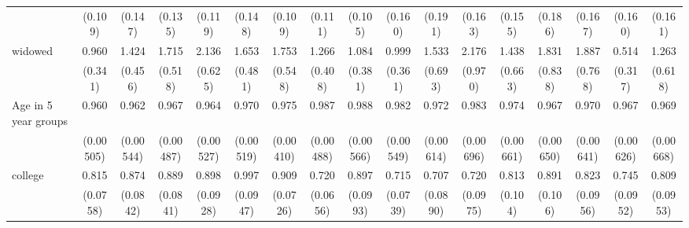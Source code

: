 {\begin{tabular}{l*{16}{c}}
                    &     (0.109)         &     (0.147)         &     (0.135)         &     (0.119)         &     (0.148)         &     (0.109)         &     (0.111)         &     (0.105)         &     (0.160)         &     (0.191)         &     (0.163)         &     (0.155)         &     (0.186)         &     (0.167)         &     (0.160)         &     (0.161)         \\
[1em]
widowed             &       0.960         &       1.424         &       1.715         &       2.136\sym{**} &       1.653         &       1.753         &       1.266         &       1.084         &       0.999         &       1.533         &       2.176         &       1.438         &       1.831         &       1.887         &       0.514         &       1.263         \\
                    &     (0.341)         &     (0.456)         &     (0.518)         &     (0.625)         &     (0.481)         &     (0.548)         &     (0.408)         &     (0.381)         &     (0.361)         &     (0.693)         &     (0.970)         &     (0.663)         &     (0.838)         &     (0.768)         &     (0.317)         &     (0.618)         \\
[1em]
Age in 5 year groups&       0.960\sym{***}&       0.962\sym{***}&       0.967\sym{***}&       0.964\sym{***}&       0.970\sym{***}&       0.975\sym{***}&       0.987\sym{*}  &       0.988\sym{*}  &       0.982\sym{**} &       0.972\sym{***}&       0.983\sym{*}  &       0.974\sym{***}&       0.967\sym{***}&       0.970\sym{***}&       0.967\sym{***}&       0.969\sym{***}\\
                    &   (0.00505)         &   (0.00544)         &   (0.00487)         &   (0.00527)         &   (0.00519)         &   (0.00410)         &   (0.00488)         &   (0.00566)         &   (0.00549)         &   (0.00614)         &   (0.00696)         &   (0.00661)         &   (0.00650)         &   (0.00641)         &   (0.00626)         &   (0.00668)         \\
[1em]
college             &       0.815\sym{*}  &       0.874         &       0.889         &       0.898         &       0.997         &       0.909         &       0.720\sym{***}&       0.897         &       0.715\sym{**} &       0.707\sym{**} &       0.720\sym{*}  &       0.813         &       0.891         &       0.823         &       0.745\sym{*}  &       0.809         \\
                    &    (0.0758)         &    (0.0842)         &    (0.0841)         &    (0.0928)         &    (0.0947)         &    (0.0726)         &    (0.0656)         &    (0.0993)         &    (0.0739)         &    (0.0890)         &    (0.0975)         &     (0.104)         &     (0.106)         &    (0.0956)         &    (0.0952)         &    (0.0953)         \\

\end{tabular}}
